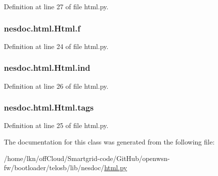 Definition at line 27 of file html.\+py.

\subsubsection[{\texorpdfstring{f}{f}}]{\setlength{\rightskip}{0pt plus 5cm}nesdoc.\+html.\+Html.\+f}\hypertarget{classnesdoc_1_1html_1_1_html_a33017817dcc3a443f2d69f7af11e936e}{}\label{classnesdoc_1_1html_1_1_html_a33017817dcc3a443f2d69f7af11e936e}


Definition at line 24 of file html.\+py.

\subsubsection[{\texorpdfstring{ind}{ind}}]{\setlength{\rightskip}{0pt plus 5cm}nesdoc.\+html.\+Html.\+ind}\hypertarget{classnesdoc_1_1html_1_1_html_ad211bb29eaa1675a0774d5ec5c396c45}{}\label{classnesdoc_1_1html_1_1_html_ad211bb29eaa1675a0774d5ec5c396c45}


Definition at line 26 of file html.\+py.

\subsubsection[{\texorpdfstring{tags}{tags}}]{\setlength{\rightskip}{0pt plus 5cm}nesdoc.\+html.\+Html.\+tags}\hypertarget{classnesdoc_1_1html_1_1_html_a3a6c5ca8b589342e34292ac677ae65a9}{}\label{classnesdoc_1_1html_1_1_html_a3a6c5ca8b589342e34292ac677ae65a9}


Definition at line 25 of file html.\+py.



The documentation for this class was generated from the following file\+:\begin{DoxyCompactItemize}
\item 
/home/lkn/off\+Cloud/\+Smartgrid-\/code/\+Git\+Hub/openwsn-\/fw/bootloader/telosb/lib/nesdoc/\hyperlink{html_8py}{html.\+py}\end{DoxyCompactItemize}
